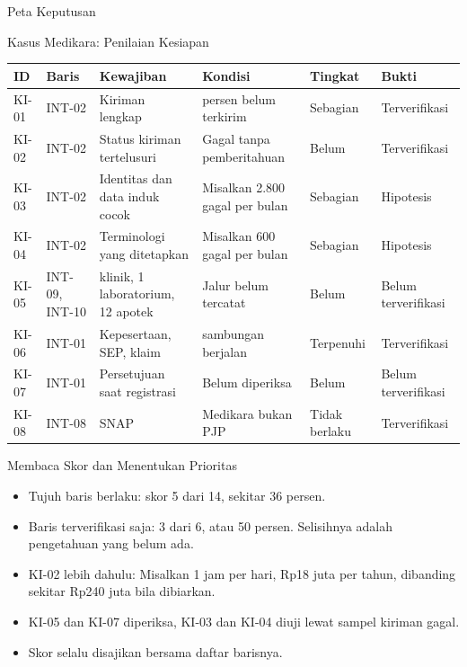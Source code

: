 \documentclass[aspectratio=169, table, 12pt]{beamer}
\begin{document}
\begin{frame}{{\Large Peta Keputusan}}
  \centering
\end{frame}

\begin{frame}{{\Large Kasus Medikara: Penilaian Kesiapan}}
  \scriptsize
  \begin{tabularx}{\textwidth}{>{\raggedright\arraybackslash}p{0.8cm}
      >{\raggedright\arraybackslash}p{1.15cm} >{\raggedright\arraybackslash}X >{\raggedright\arraybackslash}X
      >{\raggedright\arraybackslash}p{1.25cm} >{\raggedright\arraybackslash}p{1.65cm}}
    \hline
    \textbf{ID} & \textbf{Baris} & \textbf{Kewajiban} & \textbf{Kondisi} & \textbf{Tingkat} & \textbf{Bukti} \\ \hline
    KI-01 & INT-02 & Kiriman lengkap & 4 persen belum terkirim & Sebagian & Terverifikasi \\ \hline
    KI-02 & INT-02 & Status kiriman tertelusuri & Gagal tanpa pemberitahuan & Belum & Terverifikasi \\ \hline
    KI-03 & INT-02 & Identitas dan data induk cocok & Misalkan 2.800 gagal per bulan & Sebagian & Hipotesis \\ \hline
    KI-04 & INT-02 & Terminologi yang ditetapkan & Misalkan 600 gagal per bulan & Sebagian & Hipotesis \\ \hline
    KI-05 & INT-09, INT-10 & 18 klinik, 1 laboratorium, 12 apotek & Jalur belum tercatat & Belum & Belum terverifikasi \\ \hline
    KI-06 & INT-01 & Kepesertaan, SEP, klaim & 5 sambungan berjalan & Terpenuhi & Terverifikasi \\ \hline
    KI-07 & INT-01 & Persetujuan saat registrasi & Belum diperiksa & Belum & Belum terverifikasi \\ \hline
    KI-08 & INT-08 & SNAP & Medikara bukan PJP & Tidak berlaku & Terverifikasi \\ \hline
  \end{tabularx}
\end{frame}

\begin{frame}{{\Large Membaca Skor dan Menentukan Prioritas}}
  \vspace{8pt}
  \begin{itemize}
    \item Tujuh baris berlaku: skor 5 dari 14, sekitar 36 persen.
    \item Baris terverifikasi saja: 3 dari 6, atau 50 persen. Selisihnya adalah pengetahuan yang belum ada.
    \item KI-02 lebih dahulu: Misalkan 1 jam per hari, Rp18 juta per tahun, dibanding sekitar Rp240 juta bila dibiarkan.
    \item KI-05 dan KI-07 diperiksa, KI-03 dan KI-04 diuji lewat sampel kiriman gagal.
    \item Skor selalu disajikan bersama daftar barisnya.
  \end{itemize}
\end{frame}
\end{document}
